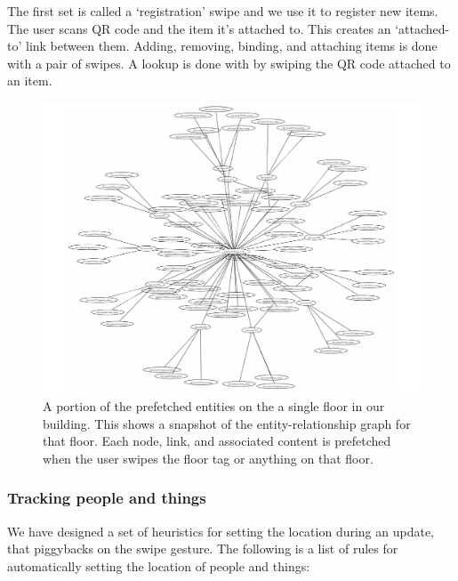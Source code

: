 The first set is called a `registration' swipe and we use it to register new items.  The user scans QR code and the item it's attached
to.  This creates an `attached-to' link between them.  Adding, removing, binding, and attaching items is done with a pair of swipes.
A lookup is done with by swiping the QR code attached to an item.


\begin{figure}[htb!]
\begin{center}
\includegraphics[scale=0.45]{figs/SDH_4F_ERG_closeup}
\caption{A portion of the prefetched entities on the a single floor in our building.  This shows a snapshot of the entity-relationship
graph for that floor.  Each node, link, and associated content is prefetched when the user swipes the floor
tag or anything on that floor.}
\label{fig:sdh_4f_erg}
\end{center}
\end{figure}

\subsubsection{Tracking people and things}
\label{sec:tracking}

We have designed a set of heuristics for setting the location during an update, that piggybacks on the swipe gesture.
The following is a list of rules for automatically setting the location of people and things:

